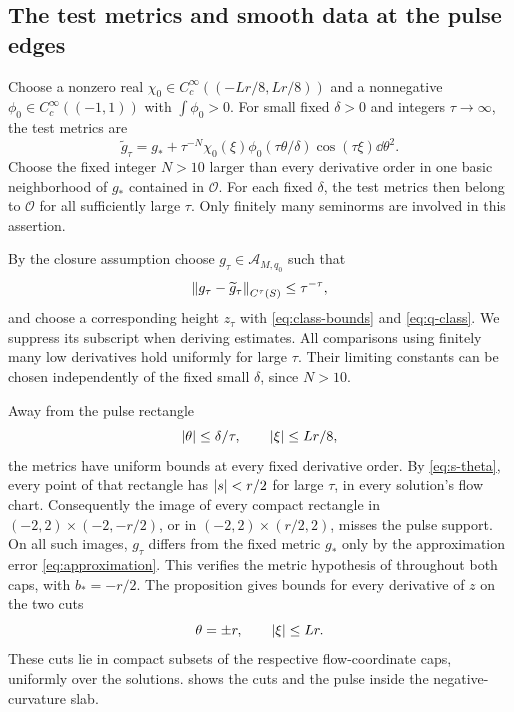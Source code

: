\subsection{The test metrics and smooth data at the pulse edges}

Choose a nonzero real \(\chi_0\in C_c^\infty((-Lr/8,Lr/8))\) and
a nonnegative \(\phi_0\in C_c^\infty((-1,1))\) with
\(\int\phi_0>0\). For small fixed \(\delta>0\) and integers
\(\tau\to\infty\), the test metrics are
\begin{equation}\label{eq:pulse}
\widetilde g_\tau
=g_*+\tau^{-N}\chi_0(\xi)\phi_0(\tau\theta/\delta)
                 \cos(\tau\xi)\dd\theta^2.
\end{equation}
Choose the fixed integer \(N>10\) larger than every derivative order
in one basic neighborhood of \(g_*\) contained in \(\mathcal O\).
For each fixed \(\delta\), the test metrics then belong to
\(\mathcal O\) for all sufficiently large \(\tau\). Only finitely
many seminorms are involved in this assertion.

By the closure assumption choose \(g_\tau\in\mathcal A_{M,q_0}\)
such that
\begin{equation}\label{eq:approximation}
\left\lVert g_\tau-\widetilde g_\tau\right\rVert_{C^\tau(S)}
\le\tau^{-\tau},
\end{equation}
and choose a corresponding height \(z_\tau\) with
\eqref{eq:class-bounds} and \eqref{eq:q-class}.
We suppress its subscript when deriving estimates.
All comparisons using finitely many low derivatives hold uniformly
for large \(\tau\). Their limiting constants can be chosen independently
of the fixed small \(\delta\), since \(N>10\).

Away from the pulse rectangle
\[
\left\lvert\theta\right\rvert\le\delta/\tau,\qquad \left\lvert\xi\right\rvert\le Lr/8,
\]
the metrics have uniform bounds at every fixed derivative order.
By \eqref{eq:s-theta}, every point of that rectangle has
\(\left\lvert s\right\rvert<r/2\) for large \(\tau\), in every solution's flow chart.
Consequently the image of every compact rectangle in
\((-2,2)\times(-2,-r/2)\), or in
\((-2,2)\times(r/2,2)\), misses the pulse support. On all such
images, \(g_\tau\) differs from the fixed metric \(g_*\) only
by the approximation error \eqref{eq:approximation}. This verifies
the metric hypothesis of  throughout both caps,
with \(b_*=-r/2\). The proposition gives bounds for every
derivative of \(z\) on the two cuts
\begin{equation}\label{eq:cap-cuts}
\theta=\pm r,\qquad \left\lvert\xi\right\rvert\le Lr.
\end{equation}
These cuts lie in compact subsets of the respective flow-coordinate
caps, uniformly over the solutions.
 shows the cuts and the pulse inside the
negative-curvature slab.

